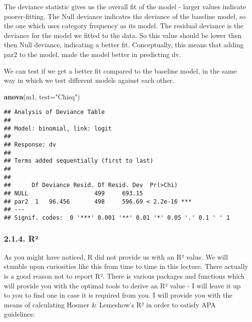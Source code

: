 \documentclass[
]{article}
\newenvironment{Shaded}{\begin{snugshade}}{\end{snugshade}}
\newcommand{\DataTypeTok}[1]{\textcolor[rgb]{0.13,0.29,0.53}{#1}}
\newcommand{\KeywordTok}[1]{\textcolor[rgb]{0.13,0.29,0.53}{\textbf{#1}}}
\newcommand{\NormalTok}[1]{#1}
\newcommand{\OperatorTok}[1]{\textcolor[rgb]{0.81,0.36,0.00}{\textbf{#1}}}
\newcommand{\StringTok}[1]{\textcolor[rgb]{0.31,0.60,0.02}{#1}}
\begin{document}
The deviance statistic gives us the overall fit of the model - larger
values indicate poorer-fitting. The Null deviance indicates the deviance
of the baseline model, so the one which uses category frequency as its
model. The residual deviance is the deviance for the model we fitted to
the data. So this value should be lower then then Null deviance,
indicating a better fit. Conceptually, this means that adding par2 to
the model, made the model better in predicting dv.

We can test if we get a better fit compared to the baseline model, in
the same way in which we test different models against each other.

\begin{Shaded}
\begin{Highlighting}[]
\KeywordTok{anova}\NormalTok{(m1, }\DataTypeTok{test=}\StringTok{"Chisq"}\NormalTok{)}
\end{Highlighting}
\end{Shaded}

\begin{verbatim}
## Analysis of Deviance Table
## 
## Model: binomial, link: logit
## 
## Response: dv
## 
## Terms added sequentially (first to last)
## 
## 
##      Df Deviance Resid. Df Resid. Dev  Pr(>Chi)    
## NULL                   499     693.15              
## par2  1   96.456       498     596.69 < 2.2e-16 ***
## ---
## Signif. codes:  0 '***' 0.001 '**' 0.01 '*' 0.05 '.' 0.1 ' ' 1
\end{verbatim}

\hypertarget{ruxb2}{%
\subsubsection{2.1.4. R²}\label{ruxb2}}

As you might have noticed, R did not provide us with an R² value. We
will stumble upon curiosities like this from time to time in this
lecture. There actually is a good reason not to report R². There is
various packages and functions which will provide you with the optimal
tools to derive an R² value - I will leave it up to you to find one in
case it is required from you. I will provide you with the means of
calculating Hosmer \& Lemeshow's R² in order to satisfy APA guidelines:

\begin{Shaded}
\end{Shaded}
\end{document}
